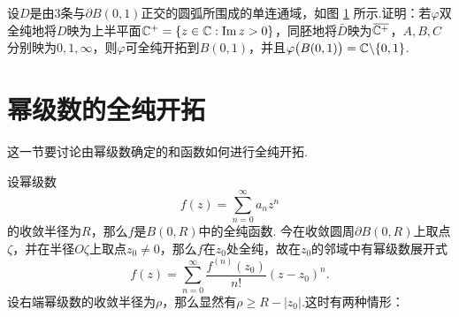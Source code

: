 \begin{xiti}
\begin{figure}[!ht]
       \caption{\label{fig6.8}}
     \end{figure}
  \item \hypertarget{xiti6.1.11}{} 设$D$是由$3$条与$\partial B(0,1)$正交的圆弧所围成的单连通域，如图 \ref{fig6.8} 所示.证明：若$\varphi$双全纯地将$D$映为上半平面$\mathbb C^+=\{z\in\mathbb C:\operatorname{Im} z>0\}$，同胚地将$\bar D$映为${}\mkern1mu\overline{\mkern-1mu\mathbb C^+}$，$A,B,C$分别映为$0,1,\infty$，则$\varphi$可全纯开拓到$B(0,1)$，并且$\varphi\big(B(0,1)\big)=\mathbb C\backslash\{0,1\}$.
\end{xiti}

\section{幂级数的全纯开拓\label{sec6.2}}
这一节要讨论由幂级数确定的和函数如何进行全纯开拓.

设幂级数
\begin{equation}\label{eq6.2.1}
  f(z) = \sum_{n=0}^\infty a_nz^n
\end{equation}
的收敛半径为$R$，那么$f$是$B(0,R)$中的全纯函数. 今在收敛圆周$\partial B(0,R)$上取点$\zeta$，并在半径$O\zeta$上取点$z_0\ne0$，那么$f$在$z_0$处全纯，故在$z_0$的邻域中有幂级数展开式
\begin{equation}\label{eq6.2.2}
  f(z) = \sum_{n=0}^\infty\frac{f^{(n)}(z_0)}{n!}(z-z_0)^n.
\end{equation}
设右端幂级数的收敛半径为$\rho$，那么显然有$\rho\ge R-|z_0|$.这时有两种情形：

